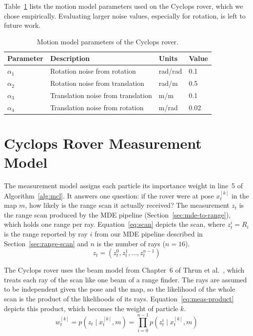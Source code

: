Table~\ref{tab:motion-params} lists the motion model parameters used on the Cyclops rover,
which we chose empirically. Evaluating larger noise values, especially for rotation, is left
to future work.
\begin{table}[htbp]
  \centering
  \caption{Motion model parameters of the Cyclops rover.}
  \label{tab:motion-params}
  \small
  \begin{tabular}{l l l l}
    \hline
    Parameter & Description & Units & Value \\
    \hline
    $\alpha_1$     & Rotation noise from rotation       & rad/rad & 0.1 \\
    $\alpha_2$     & Rotation noise from translation    & rad/m   & 0.5 \\
    $\alpha_3$     & Translation noise from translation & m/m     & 0.1 \\
    $\alpha_4$     & Translation noise from rotation    & m/rad   & 0.02 \\
    \hline
  \end{tabular}
\end{table}

\section{Cyclops Rover Measurement Model}
\label{sec:measurement-model}



The measurement model assigns each particle its importance weight in line~5 of
Algorithm~\ref{alg:mcl}. It answers one question: if the rover were at pose $x_t^{[k]}$ in
the map $m$, how likely is the range scan it actually received? The measurement $z_t$ is the
range scan produced by the MDE pipeline (Section~\ref{sec:mde-to-range}), which holds one
range per ray. Equation~\ref{eq:scan} depicts the scan, where $z_t^i = R_i$ is the range
reported by ray $i$ from our MDE pipeline described in Section~\ref{sec:range-scan} and $n$ is the number of rays ($n = 16$).
\begin{equation}
  \label{eq:scan}
  z_t = \left( z_t^0, z_t^1, \dots, z_t^{n-1} \right)
\end{equation}

The Cyclops rover uses the beam model from Chapter~6 of Thrun et
al.~\cite{thrun2005probabilistic}, which
treats each ray of the scan like one beam of a range finder. The rays are assumed to be
independent given the pose and the map, so the likelihood of the whole scan is the product of
the likelihoods of its rays. Equation~\ref{eq:meas-product} depicts this product, which
becomes the weight of particle $k$.
\begin{equation}
  \label{eq:meas-product}
  w_t^{[k]} = p\!\left(z_t \mid x_t^{[k]}, m\right)
            = \prod_{i=0}^{n-1} p\!\left(z_t^i \mid x_t^{[k]}, m\right)
\end{equation}

